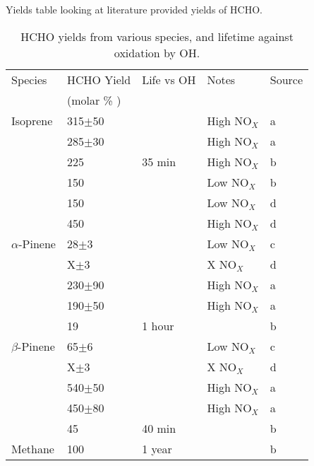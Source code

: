     Yields table looking at literature provided yields of HCHO.
    
    \begin{table} \begin{threeparttable}
      \caption{ HCHO yields from various species, and lifetime against oxidation by OH. }
      \begin{tabular}{  l  l  l  l  l  }
	\toprule
	Species           & HCHO Yield      & Life vs OH & Notes    & Source
	\\                & (molar \% )     &        &              &          \\
	\midrule 
	Isoprene          & 315$\pm$50      &        & High NO$_X$  & a        \\ 
			          & 285$\pm$30      &        & High NO$_X$  & a        \\ 
			          & 225             & 35 min & High NO$_X$  & b        \\ %
			          & 150             &        & Low  NO$_X$  & b        \\ %
			          & 150             &        & Low  NO$_X$  & d        \\
			          & 450             &        & High  NO$_X$ & d        \\
	$\alpha$-Pinene   & 28$\pm$3        &        & Low NO$_X$   & c        \\ 
			          & X$\pm$3         &        & X NO$_X$     & d        \\ 
			          & 230$\pm$90      &        & High NO$_X$  & a        \\ 
			          & 190$\pm$50      &        & High NO$_X$  & a        \\ 
			          & 19              & 1 hour &              & b        \\ %
	$\beta$-Pinene    & 65$\pm$6        &        & Low NO$_X$   & c      \\ 
			          & X$\pm$3         &        & X NO$_X$     & d      \\ 
			          & 540$\pm$50      &        & High NO$_X$  & a     \\ 
			          & 450$\pm$80      &        & High NO$_X$  & a      \\ 
			          & 45              & 40 min &              & b      \\ %
	Methane 	      & 100             & 1 year  &             & b     \\ 

\end{tabular}
\end{threeparttable}
\end{table}
